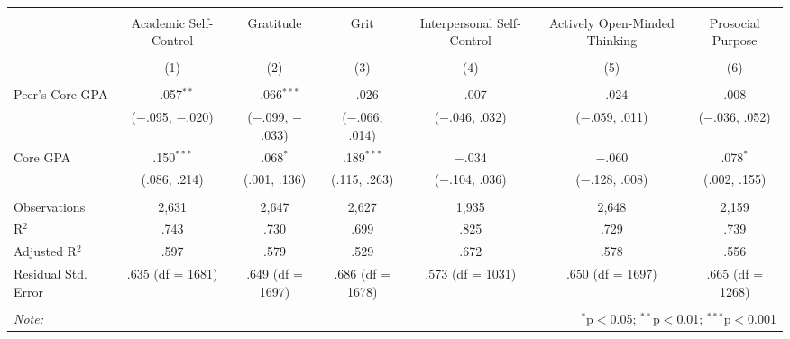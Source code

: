 
\begin{table}[!htbp] \centering 
  \caption{} 
  \label{} 
\footnotesize 
\begin{tabular}{@{\extracolsep{5pt}}lcccccc} 
\\[-1.8ex]\hline \\[-1.8ex] 
 & Academic Self-Control & Gratitude & Grit & Interpersonal Self-Control & Actively Open-Minded Thinking & Prosocial Purpose \\ 
\\[-1.8ex] & (1) & (2) & (3) & (4) & (5) & (6)\\ 
\hline \\[-1.8ex] 
 Peer's Core GPA & $-$.057$^{**}$ & $-$.066$^{***}$ & $-$.026 & $-$.007 & $-$.024 & .008 \\ 
  & ($-$.095, $-$.020) & ($-$.099, $-$.033) & ($-$.066, .014) & ($-$.046, .032) & ($-$.059, .011) & ($-$.036, .052) \\ 
  Core GPA & .150$^{***}$ & .068$^{*}$ & .189$^{***}$ & $-$.034 & $-$.060 & .078$^{*}$ \\ 
  & (.086, .214) & (.001, .136) & (.115, .263) & ($-$.104, .036) & ($-$.128, .008) & (.002, .155) \\ 
 \hline \\[-1.8ex] 
Observations & 2,631 & 2,647 & 2,627 & 1,935 & 2,648 & 2,159 \\ 
R$^{2}$ & .743 & .730 & .699 & .825 & .729 & .739 \\ 
Adjusted R$^{2}$ & .597 & .579 & .529 & .672 & .578 & .556 \\ 
Residual Std. Error & .635 (df = 1681) & .649 (df = 1697) & .686 (df = 1678) & .573 (df = 1031) & .650 (df = 1697) & .665 (df = 1268) \\ 
\hline \\[-1.8ex] 
\textit{Note:}  & \multicolumn{6}{r}{$^{*}$p$<$0.05; $^{**}$p$<$0.01; $^{***}$p$<$0.001} \\ 
\end{tabular} 
\end{table} 
